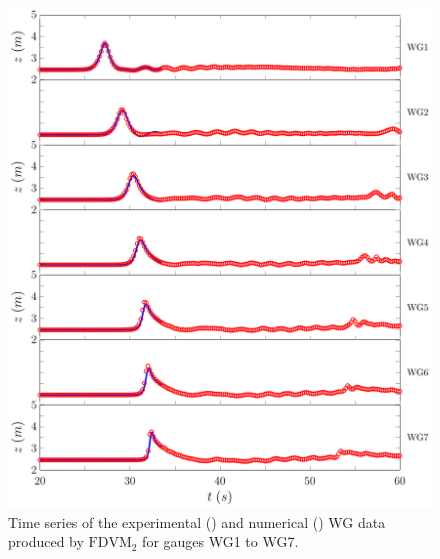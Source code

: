 \begin{figure}
	\centering
	\includegraphics[width=\textwidth]{./chp6/figures/Experiment/Roeber/Trial8/FDVM/LongWGs1.pdf}
	\caption{Time series of the experimental () and numerical ({\color{blue}\solidrule}) WG data produced by $\text{FDVM}_2$ for gauges WG1 to WG7.}
	\label{fig:Roeber8WG1to5FDVM}
\end{figure}
